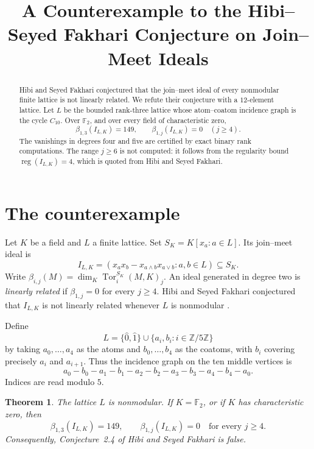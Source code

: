 \documentclass[11pt]{amsart}
\title[A counterexample on join--meet ideals]
{A Counterexample to the Hibi--Seyed Fakhari Conjecture on Join--Meet Ideals}
\date{}
\newtheorem{theorem}{Theorem}
\begin{document}
\begin{abstract}
Hibi and Seyed Fakhari conjectured that the join--meet ideal of every
nonmodular finite lattice is not linearly related. We refute their
conjecture with a $12$-element lattice. Let $L$ be the bounded
rank-three lattice whose atom--coatom incidence graph is the cycle
$C_{10}$. Over $\mathbb F_2$, and over every field of characteristic
zero,
\[
  \beta_{1,3}(I_{L,K})=149,
  \qquad
  \beta_{1,j}(I_{L,K})=0 \quad (j\ge 4).
\]
The vanishings in degrees four and five are certified by exact binary
rank computations. The range $j\ge6$ is not computed: it follows from
the regularity bound $\operatorname{reg}(I_{L,K})=4$, which is quoted
from Hibi and Seyed Fakhari.
\end{abstract}

\maketitle

\section{The counterexample}

Let $K$ be a field and $L$ a finite lattice. Set
$S_K=K[x_a:a\in L]$. Its join--meet ideal is
\[
  I_{L,K}
  =
  (x_ax_b-x_{a\wedge b}x_{a\vee b}:a,b\in L)
  \subseteq S_K.
\]
Write
$\beta_{i,j}(M)=\dim_K\operatorname{Tor}_i^{S_K}(M,K)_j$.
An ideal generated in degree two is \emph{linearly related} if
$\beta_{1,j}=0$ for every $j\ge 4$. Hibi and Seyed Fakhari conjectured
that $I_{L,K}$ is not linearly related whenever $L$ is nonmodular
\cite[Conjecture~2.4]{HSF}.

Define
\[
  L=
  \{\widehat 0,\widehat 1\}
  \cup
  \{a_i,b_i:i\in\mathbb Z/5\mathbb Z\}
\]
by taking $a_0,\ldots,a_4$ as the atoms and
$b_0,\ldots,b_4$ as the coatoms, with $b_i$ covering precisely
$a_i$ and $a_{i+1}$. Thus the incidence graph on the ten middle
vertices is
\[
  a_0-b_0-a_1-b_1-a_2-b_2-a_3-b_3-a_4-b_4-a_0.
\]
Indices are read modulo $5$.

\begin{theorem}\label{thm:main}
The lattice $L$ is nonmodular. If $K=\mathbb F_2$, or if $K$ has
characteristic zero, then
\[
  \beta_{1,3}(I_{L,K})=149,
  \qquad
  \beta_{1,j}(I_{L,K})=0
  \quad\text{for every }j\ge4.
\]
Consequently, Conjecture~2.4 of Hibi and Seyed Fakhari is false.
\end{theorem}
\end{document}

